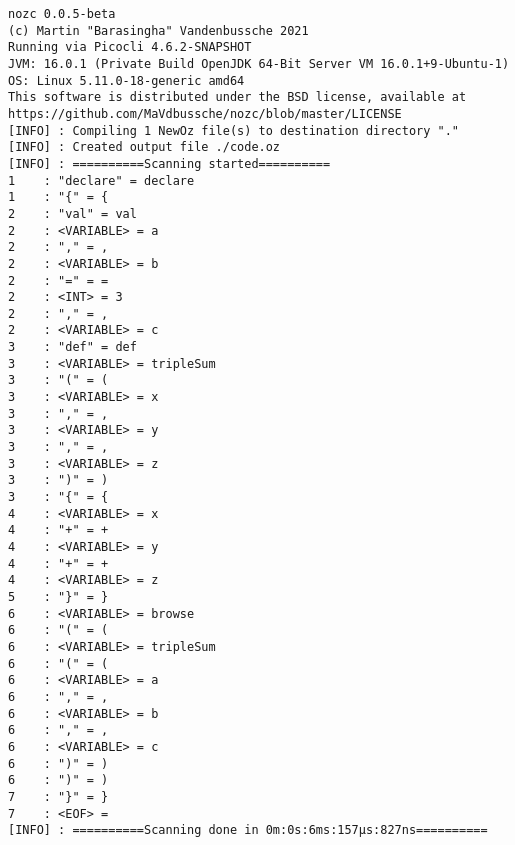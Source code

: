 \begin{lstlisting}[label={lst:compilation-t},title={Output of the command "\texttt{\$ nozc code.nozc -t}", demonstrating the first part of the compilation (lexer/tokenizer)}]
nozc 0.0.5-beta
(c) Martin "Barasingha" Vandenbussche 2021
Running via Picocli 4.6.2-SNAPSHOT
JVM: 16.0.1 (Private Build OpenJDK 64-Bit Server VM 16.0.1+9-Ubuntu-1)
OS: Linux 5.11.0-18-generic amd64
This software is distributed under the BSD license, available at https://github.com/MaVdbussche/nozc/blob/master/LICENSE
[INFO] : Compiling 1 NewOz file(s) to destination directory "."
[INFO] : Created output file ./code.oz
[INFO] : ==========Scanning started==========
1	 : "declare" = declare
1	 : "{" = {
2	 : "val" = val
2	 : <VARIABLE> = a
2	 : "," = ,
2	 : <VARIABLE> = b
2	 : "=" = =
2	 : <INT> = 3
2	 : "," = ,
2	 : <VARIABLE> = c
3	 : "def" = def
3	 : <VARIABLE> = tripleSum
3	 : "(" = (
3	 : <VARIABLE> = x
3	 : "," = ,
3	 : <VARIABLE> = y
3	 : "," = ,
3	 : <VARIABLE> = z
3	 : ")" = )
3	 : "{" = {
4	 : <VARIABLE> = x
4	 : "+" = +
4	 : <VARIABLE> = y
4	 : "+" = +
4	 : <VARIABLE> = z
5	 : "}" = }
6	 : <VARIABLE> = browse
6	 : "(" = (
6	 : <VARIABLE> = tripleSum
6	 : "(" = (
6	 : <VARIABLE> = a
6	 : "," = ,
6	 : <VARIABLE> = b
6	 : "," = ,
6	 : <VARIABLE> = c
6	 : ")" = )
6	 : ")" = )
7	 : "}" = }
7	 : <EOF> =
[INFO] : ==========Scanning done in 0m:0s:6ms:157µs:827ns==========
\end{lstlisting}
